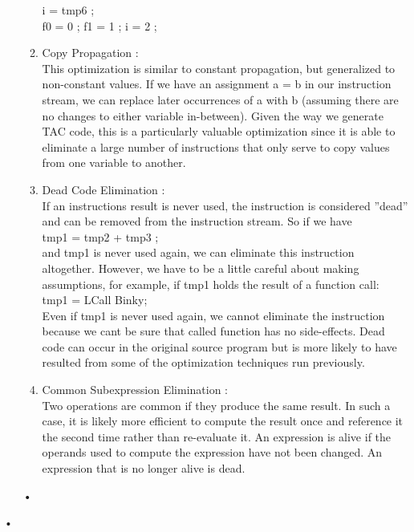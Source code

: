 \documentclass[11pt]{article}
\begin{document}
\begin{enumerate}
\begin{enumerate}
			i = tmp6 ;\\
			f0 = 0 ; f1 = 1 ; i = 2 ;\\
			\item Copy Propagation :\\
			This optimization is similar to constant propagation, but generalized to non-constant values. If we have an assignment a = b in our instruction stream, we can replace later occurrences of a with b (assuming there are no changes to either variable in-between). Given the way we generate TAC code, this is a particularly valuable optimization since it is able to eliminate a large number of instructions that only serve to copy values from one variable to another.
			\item Dead Code Elimination :\\
			If an instructions result is never used, the instruction is considered ”dead” and can be removed from the instruction stream. So if we have\\
			tmp1 = tmp2 + tmp3 ;\\
			and tmp1 is never used again, we can eliminate this instruction altogether. However, we have to be a little careful about making assumptions, for example, if tmp1 holds the result of a function call:\\
			tmp1 = LCall Binky;\\
			Even if tmp1 is never used again, we cannot eliminate the instruction because we cant be sure that called function has no side-effects. Dead code can occur in the original source program but is more likely to have resulted from some of the optimization techniques run previously.
			\item Common Subexpression Elimination :\\
			Two operations are common if they produce the same result. In such a case, it is likely more efficient to compute the result once and reference it the second time rather than re-evaluate it. An expression is alive if the operands used to compute the expression have not been changed. An expression that is no longer alive is dead.
			
		\end{enumerate}•
	\end{enumerate}•
	
\end{document}

